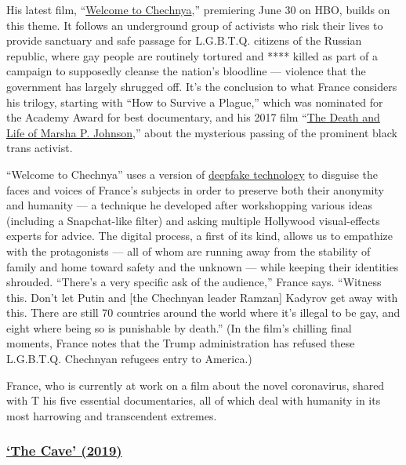 His latest film,
``\href{https://www.hbo.com/documentaries/welcome-to-chechnya/about}{Welcome
to Chechnya},'' premiering June 30 on HBO, builds on this theme. It
follows an underground group of activists who risk their lives to
provide sanctuary and safe passage for L.G.B.T.Q. citizens of the
Russian republic, where gay people are routinely tortured and ****
killed as part of a campaign to supposedly cleanse the nation's
bloodline --- violence that the government has largely shrugged off.
It's the conclusion to what France considers his trilogy, starting with
``How to Survive a Plague,'' which was nominated for the Academy Award
for best documentary, and his 2017 film
``\href{https://www.nytimes.com/watching/titles/the-death-and-life-of-marsha-p-johnson}{The
Death and Life of Marsha P. Johnson},'' about the mysterious passing of
the prominent black trans activist.

``Welcome to Chechnya'' uses a version of
\href{https://www.nytimes.com/2019/11/24/technology/tech-companies-deepfakes.html}{deepfake
technology} to disguise the faces and voices of France's subjects in
order to preserve both their anonymity and humanity --- a technique he
developed after workshopping various ideas (including a Snapchat-like
filter) and asking multiple Hollywood visual-effects experts for advice.
The digital process, a first of its kind, allows us to empathize with
the protagonists --- all of whom are running away from the stability of
family and home toward safety and the unknown --- while keeping their
identities shrouded. ``There's a very specific ask of the audience,''
France says. ``Witness this. Don't let Putin and {[}the Chechnyan leader
Ramzan{]} Kadyrov get away with this. There are still 70 countries
around the world where it's illegal to be gay, and eight where being so
is punishable by death.'' (In the film's chilling final moments, France
notes that the Trump administration has refused these L.G.B.T.Q.
Chechnyan refugees entry to America.)

France, who is currently at work on a film about the novel coronavirus,
shared with T his five essential documentaries, all of which deal with
humanity in its most harrowing and transcendent extremes.

\hypertarget{the-cave-2019}{%
\subsubsection{\texorpdfstring{\href{https://www.nytimes.com/2019/10/17/movies/the-cave-review.html}{`The
Cave' (2019)}}{`The Cave' (2019)}}\label{the-cave-2019}}

